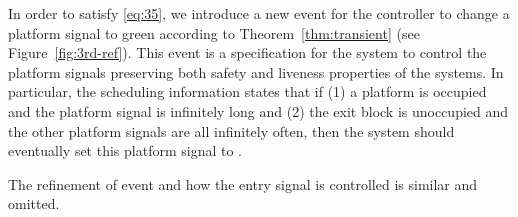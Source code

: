 \documentclass{llncs}
\newcounter{thm}
\begin{document}
In order to satisfy \ref{eq:35}, we introduce a new event
\ctrlplf for the controller to change a platform signal to green according to
Theorem~\ref{thm:transient} (see Figure~\ref{fig:3rd-ref}).
This event \ctrlplf is a specification for the system to control the
platform signals preserving both safety and liveness properties of the
systems.  In particular, the scheduling information states that if (1)
a platform is occupied and the platform signal is \RED infinitely long
and (2) the exit block is unoccupied and the other platform signals
are all \RED infinitely often, then the system should eventually set
this platform signal to \GREEN.

The refinement of event \movein and how the entry signal is controlled
is similar and omitted.
\end{document}
